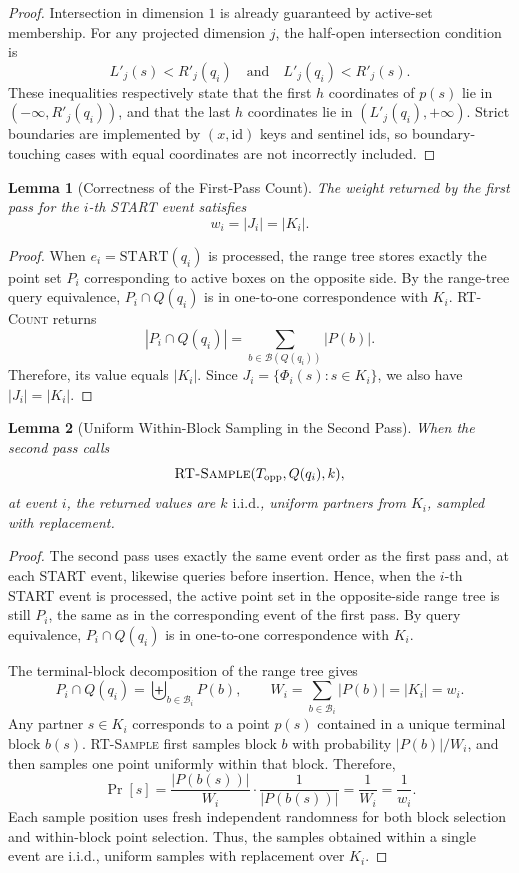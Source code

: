 \documentclass[11pt]{article}
\newtheorem{lemma}{Lemma}[section]
\newcommand{\Start}{\mathrm{START}}
\newcommand{\id}{\mathrm{id}}
\newcommand{\Bcal}{\mathcal B}
\newcommand{\iid}{\mathrm{i.i.d.}}
\begin{document}
\begin{proof}
Intersection in dimension \(1\) is already guaranteed by active-set membership. For any projected dimension \(j\), the half-open intersection condition is
\[
 L'_j(s)<R'_j(q_i)
 \quad\text{and}\quad
 L'_j(q_i)<R'_j(s).
\]
These inequalities respectively state that the first \(h\) coordinates of \(p(s)\) lie in \((-\infty,R'_j(q_i))\), and that the last \(h\) coordinates lie in \((L'_j(q_i),+\infty)\). Strict boundaries are implemented by \((x,\id)\) keys and sentinel ids, so boundary-touching cases with equal coordinates are not incorrectly included.
\end{proof}

\begin{lemma}[Correctness of the First-Pass Count]
The weight returned by the first pass for the \(i\)-th START event satisfies
\[
 w_i=|J_i|=|K_i|.
\]
\end{lemma}

\begin{proof}
When \(e_i=\Start(q_i)\) is processed, the range tree stores exactly the point set \(P_i\) corresponding to active boxes on the opposite side. By the range-tree query equivalence, \(P_i\cap Q(q_i)\) is in one-to-one correspondence with \(K_i\). \textsc{RT-Count} returns
\[
 |P_i\cap Q(q_i)|=
 \sum_{b\in\Bcal(Q(q_i))}|P(b)|.
\]
Therefore, its value equals \(|K_i|\). Since \(J_i=\{\Phi_i(s):s\in K_i\}\), we also have \(|J_i|=|K_i|\).
\end{proof}

\begin{lemma}[Uniform Within-Block Sampling in the Second Pass]
When the second pass calls
\[
\Call{RT-Sample}{T_{\mathrm{opp}},Q(q_i),k},
\]
at event \(i\), the returned values are \(k\) \(\iid\), uniform partners from \(K_i\), sampled with replacement.
\end{lemma}

\begin{proof}
The second pass uses exactly the same event order as the first pass and, at each START event, likewise queries before insertion. Hence, when the \(i\)-th START event is processed, the active point set in the opposite-side range tree is still \(P_i\), the same as in the corresponding event of the first pass. By query equivalence, \(P_i\cap Q(q_i)\) is in one-to-one correspondence with \(K_i\).

The terminal-block decomposition of the range tree gives
\[
 P_i\cap Q(q_i)=\biguplus_{b\in\Bcal_i}P(b),
 \qquad
 W_i=\sum_{b\in\Bcal_i}|P(b)|=|K_i|=w_i.
\]
Any partner \(s\in K_i\) corresponds to a point \(p(s)\) contained in a unique terminal block \(b(s)\). \textsc{RT-Sample} first samples block \(b\) with probability \(|P(b)|/W_i\), and then samples one point uniformly within that block. Therefore,
\[
 \Pr[s]
 =\frac{|P(b(s))|}{W_i}\cdot\frac1{|P(b(s))|}
 =\frac1{W_i}
 =\frac1{w_i}.
\]
Each sample position uses fresh independent randomness for both block selection and within-block point selection. Thus, the samples obtained within a single event are \(\iid\), uniform samples with replacement over \(K_i\).
\end{proof}
\end{document}

